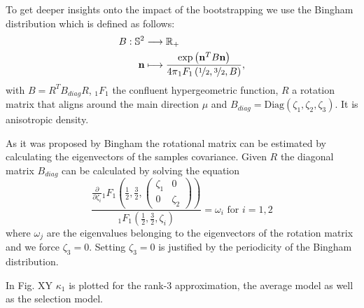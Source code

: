 To get deeper insights onto the impact of the bootstrapping we use the  Bingham 
distribution which is defined as follows: 
\begin{align*}
	B : \mathbb{S}^2 & \longrightarrow  \mathbb{R}_+ \\
	 	\mathbf{n} & \longmapsto   
	\frac{\exp \left( \mathbf{n}^T B \mathbf{n} \right)}{4 \pi {}_1F_1
	\left( \nicefrac{1}{2} , \nicefrac{3}{2} , B \right)} ,  
\end{align*}
with $B = R^T B_{diag} R$, ${}_1 F_1$ the confluent hypergeometric function, $R$
a rotation matrix that aligns around the main direction $\mu$ and $B_{diag} =
\text{Diag} \left( \zeta_1 , \zeta_2 , \zeta_3 \right)$. It is anisotropic density.

As it was proposed by Bingham the rotational matrix can be estimated by
calculating the eigenvectors of the samples covariance. Given $R$
the diagonal matrix $B_{diag}$ can be calculated by solving the
equation 
\[ 
	\frac{ \frac{\partial}{\partial \zeta_i} {}_1F_1 \left( \frac{1}{2} , \frac{3}{2} , \left( 
		\begin{matrix} 
			\zeta_1	& 0 \\
			0 & \zeta_2 
		\end{matrix}
\right) \right) }{ {}_1F_1 \left( \frac{1}{2} , \frac{3}{2} , \zeta_i \right) }
= \omega_i \text{ for } i = 1,2
\]
where $\omega_j$ are the eigenvalues belonging to the eigenvectors of the
rotation matrix and we force $\zeta_3 = 0$. Setting $\zeta_3=0$  is justified by the periodicity
of the Bingham distribution. 

In Fig. XY
$\kappa_1$ is plotted for the rank-$3$ approximation, the average model as well
as the selection model.


